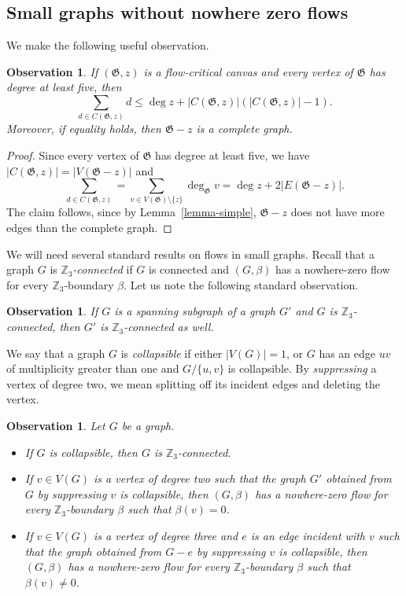 \documentclass{article}
\newcommand{\Z}{\mathbb{Z}_3}
\newcommand\g{\mathfrak{G}}
\newtheorem{observation}[theorem]{Observation}
\begin{document}
\subsection{Small graphs without nowhere zero flows}
We make the following useful observation.
\begin{observation}\label{obs-sumdeg}
If $(\g,z)$ is a flow-critical canvas and every vertex of $\g$ has degree at least five, then
$$\sum_{d \in C(\g,z)} d \leq \deg z+|C(\g,z)|(|C(\g,z)|-1).$$
Moreover, if equality holds, then $\g-z$ is a complete graph.
\end{observation}
\begin{proof}
Since every vertex of $\g$ has degree at least five, we have $|C(\g,z)|=|V(\g-z)|$
and
$$\sum_{d \in C(\g,z)}=\sum_{v\in V(\g)\setminus\{z\}} \deg_{\g} v=\deg z+2|E(\g-z)|.$$
The claim follows, since by Lemma~\ref{lemma-simple}, $\g-z$ does not have more edges than the complete graph.
\end{proof}
We will need several standard results on flows in small graphs.  Recall that a graph $G$ is \emph{$\Z$-connected} if $G$ is connected and $(G,\beta)$ has a nowhere-zero flow for every $\Z$-boundary $\beta$.
Let us note the following standard observation.
\begin{observation}
If $G$ is a spanning subgraph of a graph $G'$ and $G$ is $\Z$-connected, then $G'$ is $\Z$-connected as well.
\end{observation}
We say that a graph $G$ is \emph{collapsible} if either $|V(G)|=1$, or $G$ has an edge $uv$ of multiplicity greater than one
and $G/\{u,v\}$ is collapsible. By \emph{suppressing} a vertex of degree two, we mean splitting off its incident edges and deleting the vertex.
\begin{observation}\label{obs-collaps}
Let $G$ be a graph.
\begin{itemize}
\item If $G$ is collapsible, then $G$ is $\Z$-connected.
\item If $v\in V(G)$ is a vertex of degree two such that the graph $G'$ obtained from $G$ by suppressing $v$ is collapsible, then $(G,\beta)$ has a nowhere-zero flow for every $\Z$-boundary $\beta$ such that $\beta(v)=0$.
\item If $v\in V(G)$ is a vertex of degree three and $e$ is an edge incident with $v$ such that the graph obtained from $G-e$ by suppressing $v$ is collapsible, then $(G,\beta)$ has a nowhere-zero flow for every $\Z$-boundary $\beta$ such that $\beta(v)\neq 0$.
\end{itemize}
\end{observation}
\end{document}
